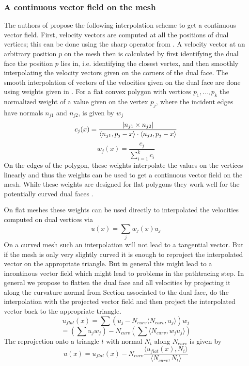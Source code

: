 \subsubsection{A continuous vector field on the mesh}
The authors of  propose the following interpolation scheme to get a  continuous vector field. First, velocity vectors are computed at all the positions of dual vertices; this can be done using the sharp operator from . A velocity vector at an arbitrary position $p$ on the mesh then is calculated by first identifying the dual face the position $p$ lies in, i.e. identifying the closest vertex,  and then smoothly interpolating the velocity vectors given on the corners of the dual face.
The smooth interpolation of vectors of the velocities given on the dual face are done using weights given in . For a flat convex polygon with vertices $p_1,...,p_k$ the normalized  weight of a value given on the vertex $p_j$, where the incident edges have normals $n_{j1}$ and $n_{j2}$, is given by $w_j$
\[c_j(x) = \frac{\left| n_{j1} \times n_{j2} \right|}{\langle n_{j1}, p_j -x\rangle\cdot\langle n_{j2}, p_j -x\rangle}\]
\[w_j(x) = \frac{c_j}{\sum_{i=1}^k c_i}\]
On the edges of the polygon, these weights interpolate the values on the vertices linearly and thus the weights can be used to get a continuous vector field on the mesh. While these weights are designed for flat polygons they work well for the potentially curved dual faces .

On flat meshes these weights can be used directly to interpolated the velocities computed on dual vertices via
\[u(x) = \sum_{j} w_j(x) u_j\] 
On a curved mesh such an interpolation will not lead to a tangential vector. But if the mesh is only very slightly curved it is enough to reproject the interpolated vector on the appropriate triangle. But in general this might lead to a incontinous vector field which might lead to problems in the pathtracing step. In general we propose to  flatten  the dual face and all velocities by projecting it along the curvature normal from Section  associated to the dual face, do the interpolation with the projected vector field and then project the interpolated vector back to the appropriate triangle. 
\[u_{flat}(x) = \sum (u_j - N_{curv} \langle N_{curv}, u_j \rangle) w_j\]
\[= (\sum u_j w_j )- N_{curv} (\sum \langle N_{curv}, w_j u_j \rangle)\]
The reprojection onto a triangle $t$ with normal $N_t$ along $N_{curv}$ is given by
\[u(x) = u_{flat}(x) - N_{curv} \frac{\langle u_{flat}(x), N_{t}\rangle}{ \langle N_{curv}, N_t \rangle}\]


